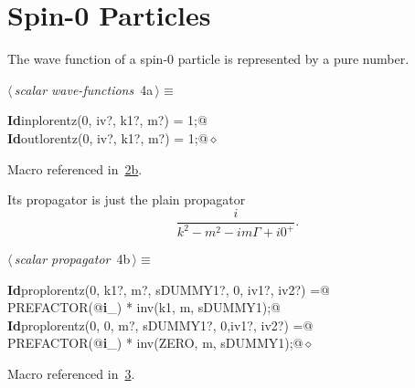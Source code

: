 \documentclass[a4paper,12pt]{amsart}
\renewcommand{\NWtarget}[2]{\hypertarget{#1}{#2}}
\renewcommand{\NWlink}[2]{\hyperlink{#1}{#2}}
\renewcommand{\NWtxtMacroRefIn}{Macro referenced in}
\renewcommand{\NWsep}{${\diamond}$}
\begin{document}
\section{Spin-0 Particles}
The wave function of a spin-0 particle is represented by a pure number.
\begin{flushleft} \small
\begin{minipage}{\linewidth}\label{scrap4}\raggedright\small
\NWtarget{nuweb4a}{} $\langle\,${\itshape scalar wave-functions}\nobreak\ {\footnotesize {4a}}$\,\rangle\equiv$
\vspace{-1ex}
\begin{list}{}{} \item
\mbox{}\verb@@\hbox{\sffamily\bfseries Id}\verb@ inplorentz(0, iv?, k1?, m?) = 1;@\\
\mbox{}\verb@@\hbox{\sffamily\bfseries Id}\verb@ outlorentz(0, iv?, k1?, m?) = 1;@{\NWsep}
\end{list}
\vspace{-1.5ex}
\footnotesize
\begin{list}{}{\setlength{\itemsep}{-\parsep}\setlength{\itemindent}{-\leftmargin}}
\item \NWtxtMacroRefIn\ \NWlink{nuweb2b}{2b}.

\item{}
\end{list}
\end{minipage}\vspace{4ex}
\end{flushleft}
Its propagator is just the plain propagator
\begin{equation}
\frac{i}{k^2-m^2-im\Gamma+i0^+}\text{.}
\end{equation}
\begin{flushleft} \small
\begin{minipage}{\linewidth}\label{scrap5}\raggedright\small
\NWtarget{nuweb4b}{} $\langle\,${\itshape scalar propagator}\nobreak\ {\footnotesize {4b}}$\,\rangle\equiv$
\vspace{-1ex}
\begin{list}{}{} \item
\mbox{}\verb@@\hbox{\sffamily\bfseries Id}\verb@ proplorentz(0, k1?, m?, sDUMMY1?, 0, iv1?, iv2?) =@\\
\mbox{}\verb@   PREFACTOR(@\hbox{\sffamily\bfseries i}\verb@_) * inv(k1, m, sDUMMY1);@\\
\mbox{}\verb@@\hbox{\sffamily\bfseries Id}\verb@ proplorentz(0, 0, m?, sDUMMY1?, 0,iv1?, iv2?) =@\\
\mbox{}\verb@   PREFACTOR(@\hbox{\sffamily\bfseries i}\verb@_) * inv(ZERO, m, sDUMMY1);@{\NWsep}
\end{list}
\vspace{-1.5ex}
\footnotesize
\begin{list}{}{\setlength{\itemsep}{-\parsep}\setlength{\itemindent}{-\leftmargin}}
\item \NWtxtMacroRefIn\ \NWlink{nuweb3}{3}.

\item{}
\end{list}
\end{minipage}\vspace{4ex}
\end{flushleft}
\end{document}
